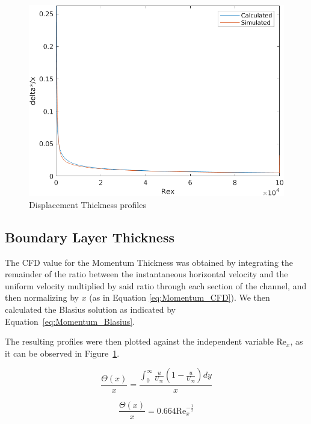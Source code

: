 \documentclass[12pt]{article}
\begin{document}
                \begin{figure}[ht!]
                        \centering
                        \includegraphics[width=\textwidth]{DT.png}
                        \caption{Displacement Thickness profiles}
                        \label{fig:DT}
                \end{figure}

        \subsection{Boundary Layer Thickness}

                The CFD value for the Momentum Thickness was obtained by integrating the remainder of the ratio between the instantaneous horizontal velocity and the uniform velocity multiplied by said ratio through each section of the channel, and then normalizing by $ x $ (as in Equation \ref{eq:Momentum_CFD}). We then calculated the Blasius solution as indicated by Equation~\ref{eq:Momentum_Blasius}.

                The resulting profiles were then plotted against the independent variable $ \text{Re}_x $, as it can be observed in Figure~\ref{fig:DT}.

                \begin{equation} \label{eq:Momentum_CFD}
                        \frac{\Theta(x)}{x} = \frac{\int_0^\infty \frac{u}{U_\infty} (1 - \frac{u}{U_\infty}) dy}{x}
                \end{equation}

                \begin{equation} \label{eq:Momentum_Blasius}
                        \frac{\Theta(x)}{x} = 0.664 \text{Re}_x^{-\frac{1}{2}}
                \end{equation}
\end{document}
